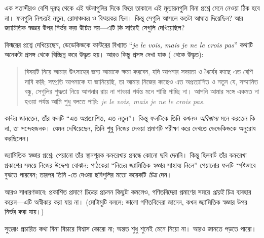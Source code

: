 \documentclass[../../../include/open-logic-section]{subfiles}
\begin{document}


এক শতাব্দীরও বেশি দূরত্ব থেকে
এই ঘটনাগুলির দিকে ফিরে
তাকালে এই মূল্যায়নগুলি
বিনা প্রশ্নে মেনে নেওয়া
ঠিক হবে না। ফলগুলি
নিশ্চয়ই নতুন, রোমাঞ্চকর
ও বিস্ময়কর ছিল। কিন্তু
সেগুলি আসলে কতটা
আঘাত দিয়েছিল? আর
জ্যামিতিক স্বজ্ঞার উপর
নির্ভর করা উচিত নয়—এটি
কি সত্যিই সেগুলি দেখিয়েছিল?

বিস্ময়ের প্রশ্নে
\citet{Gouvea2011}
দেখিয়েছেন, ডেডেকিন্ডকে
কান্টরের বিখ্যাত
“\emph{je le vois,
mais je ne le crois
pas}” কথাটি
অনেকটা প্রসঙ্গ
থেকে বিচ্ছিন্ন
করে উদ্ধৃত হয়।
আরও কিছু প্রসঙ্গ
দেখা যাক
(\citeauthor{Gouvea2011}
থেকে উদ্ধৃত):
\begin{quote}
বিষয়টি নিয়ে আমার
উৎসাহের জন্য আমাকে
ক্ষমা করবেন, যদি
আপনার সদয়তা ও
ধৈর্যের কাছে এত
বেশি দাবি করি;
সম্প্রতি আপনাকে
যা জানিয়েছি,
তা আমার নিজের
কাছেও এত
অপ্রত্যাশিত ও
নতুন যে, সম্মানিত
বন্ধু, সেগুলির
শুদ্ধতা নিয়ে
আপনার রায় না
পাওয়া পর্যন্ত
মনে শান্তি
পাচ্ছি না।
আপনি আমার
সঙ্গে একমত
না হওয়া পর্যন্ত
আমি শুধু বলতে
পারি:
\emph{je le vois,
mais je ne le
crois pas.}
\end{quote}
কান্টর জানতেন,
তাঁর ফলটি
“এত অপ্রত্যাশিত,
এত নতুন”।
কিন্তু ফলটিকে
তিনি কখনও
\emph{অবিশ্বাস্য}
মনে করতেন
কি না, তা
সন্দেহজনক।
\citeauthor{Gouvea2011}
যেমন দেখিয়েছেন,
তিনি শুধু নিজের
দেওয়া প্রমাণটি
পরীক্ষা করে
দেখতে
ডেডেকিন্ডকে
অনুরোধ
করছিলেন।

জ্যামিতিক
স্বজ্ঞার
প্রশ্নে:
পেয়ানো তাঁর
স্থানপূরক
বক্ররেখার
প্রবন্ধে
কোনো ছবি
দেননি।
কিন্তু
হিলবার্ট
তাঁর
বক্ররেখা
প্রকাশের
সময়ে
নিজের
উদ্দেশ্য
বোঝান:
পাঠকেরা
“নিচের
জ্যামিতিক
স্বজ্ঞার
সাহায্য
নিলে”
পেয়ানোর
ফলটি
স্পষ্টভাবে
বুঝতে
পারবেন;
তারপর
তিনি
-তে
দেওয়া
ছবিগুলির
মতো
কয়েকটি
\emph{চিত্র}
দেন।

আরও
সাধারণভাবে:
প্রকাশিত
প্রমাণে
চিত্রের
প্রচলন
কিছুটা
কমলেও,
গণিতবিদেরা
প্রমাণের
সময়ে
\emph{প্রায়ই}
চিত্র
ব্যবহার
করেন—এটি
অস্বীকার
করা
যায় না।
(মোটামুটি
বললে:
ভালো
গণিতবিদেরা
জানেন,
কখন
জ্যামিতিক
স্বজ্ঞার
উপর
নির্ভর
করা
যায়।)

সুতরাং
প্রচারিত
কথা
বিনা
বিচারে
বিশ্বাস
কোরো না;
অন্তত
শুধু
শুনেই
মেনে
নিয়ো
না।
আরও
জানতে
\citet{Giaquinto2007}
পড়তে
পারো।
\end{document}
